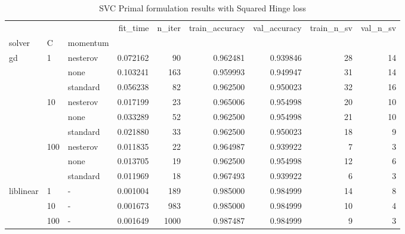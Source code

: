 \begin{table}[h!]
\centering
\caption{SVC Primal formulation results with Squared Hinge loss}
\label{primal_svc_squared_hinge_cv_results}
\begin{tabular}{lllrrrrrr}
\toprule
          &     &   &  fit\_time &  n\_iter &  train\_accuracy &  val\_accuracy &  train\_n\_sv &  val\_n\_sv \\
solver & C & momentum &           &         &                 &               &             &           \\
\midrule
gd & 1   & nesterov &  0.072162 &      90 &        0.962481 &      0.939846 &          28 &        14 \\
          &     & none &  0.103241 &     163 &        0.959993 &      0.949947 &          31 &        14 \\
          &     & standard &  0.056238 &      82 &        0.962500 &      0.950023 &          32 &        16 \\
          & 10  & nesterov &  0.017199 &      23 &        0.965006 &      0.954998 &          20 &        10 \\
          &     & none &  0.033289 &      52 &        0.962500 &      0.954998 &          21 &        10 \\
          &     & standard &  0.021880 &      33 &        0.962500 &      0.950023 &          18 &         9 \\
          & 100 & nesterov &  0.011835 &      22 &        0.964987 &      0.939922 &           7 &         3 \\
          &     & none &  0.013705 &      19 &        0.962500 &      0.954998 &          12 &         6 \\
          &     & standard &  0.011969 &      18 &        0.967493 &      0.939922 &           6 &         3 \\
liblinear & 1   & - &  0.001004 &     189 &        0.985000 &      0.984999 &          14 &         8 \\
          & 10  & - &  0.001673 &     983 &        0.985000 &      0.984999 &          10 &         4 \\
          & 100 & - &  0.001649 &    1000 &        0.987487 &      0.984999 &           9 &         3 \\
\bottomrule
\end{tabular}
\end{table}
